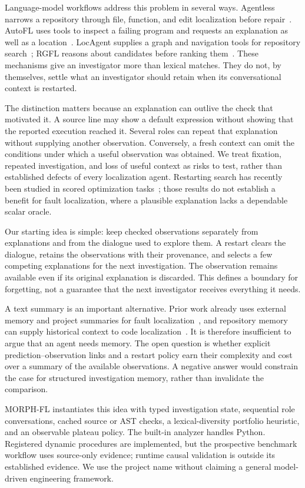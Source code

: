 \documentclass[letterpaper,journal]{IEEEtran}
\newcommand{\tool}{MORPH-FL}
\begin{document}
Language-model workflows address this problem in several ways. Agentless narrows a repository through file, function, and edit localization before repair~\cite{agentless2025}. AutoFL uses tools to inspect a failing program and requests an explanation as well as a location~\cite{autofl2024}. LocAgent supplies a graph and navigation tools for repository search~\cite{locagent2025}; RGFL reasons about candidates before ranking them~\cite{rgfl2026}. These mechanisms give an investigator more than lexical matches. They do not, by themselves, settle what an investigator should retain when its conversational context is restarted.

The distinction matters because an explanation can outlive the check that motivated it. A source line may show a default expression without showing that the reported execution reached it. Several roles can repeat that explanation without supplying another observation. Conversely, a fresh context can omit the conditions under which a useful observation was obtained. We treat fixation, repeated investigation, and loss of useful context as risks to test, rather than established defects of every localization agent. Restarting search has recently been studied in scored optimization tasks~\cite{forgetting2026}; those results do not establish a benefit for fault localization, where a plausible explanation lacks a dependable scalar oracle.

Our starting idea is simple: keep checked observations separately from explanations and from the dialogue used to explore them. A restart clears the dialogue, retains the observations with their provenance, and selects a few competing explanations for the next investigation. The observation remains available even if its original explanation is discarded. This defines a boundary for forgetting, not a guarantee that the next investigator receives everything it needs.

A text summary is an important alternative. Prior work already uses external memory and project summaries for fault localization~\cite{memfl2025}, and repository memory can supply historical context to code localization~\cite{repomem2026}. It is therefore insufficient to argue that an agent needs memory. The open question is whether explicit prediction--observation links and a restart policy earn their complexity and cost over a summary of the available observations. A negative answer would constrain the case for structured investigation memory, rather than invalidate the comparison.

\tool{} instantiates this idea with typed investigation state, sequential role conversations, cached source or AST checks, a lexical-diversity portfolio heuristic, and an observable plateau policy. The built-in analyzer handles Python. Registered dynamic procedures are implemented, but the prospective benchmark workflow uses source-only evidence; runtime causal validation is outside its established evidence. We use the project name without claiming a general model-driven engineering framework.
\end{document}
